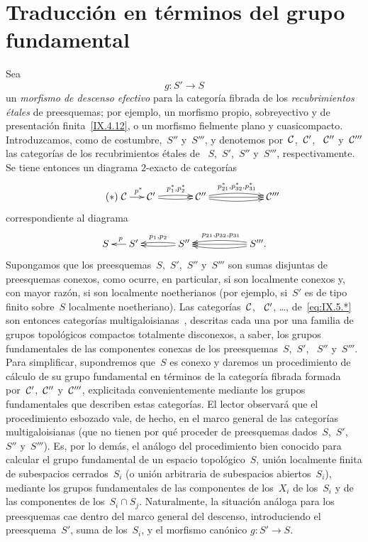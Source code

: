 \section{Traducción en términos del grupo fundamental}
\label{IX.5}

Sea
$$
g\colon S'\to S
$$
un \emph{morfismo de descenso efectivo} para la categoría fibrada de los
\emph{recubrimientos étales} de preesquemas; por ejemplo, un morfismo propio,
sobreyectivo y de presentación finita~\eqref{IX.4.12},
o un morfismo fielmente plano y cuasicompacto. Introduzcamos, como de
costumbre,~$S''$ y~$S'''$, y denotemos por~$\cal{C}$,~$\cal{C}'$,
~$\cal{C}''$ y~$\cal{C}'''$ las categorías de los recubrimientos étales de
~$S$,~$S'$,~$S''$ y~$S'''$, respectivamente. Se tiene entonces un diagrama
$2$-exacto de categorías
\begin{equation*}
\label{eq:IX.5.*}
\tag{$*$}
\xymatrix@C=.5cm{
{\cal{C}} \ar[r]^-{~p^*} & {\cal{C}'}
\ar@/^2pt/[rr]^{p_1^*,p_2^*} \ar@/_2pt/[rr] && {\cal{C}''}
\ar@/^4pt/[rrr]^{p_{21}^*,p_{32}^*,p_{31}^*} \ar[rrr] \ar@/_4pt/[rrr] &&&
{\cal{C}'''}
}
\end{equation*}
correspondiente al diagrama
$$
\xymatrix@C=.5cm{ S & \ar[l]_-{~p} S' && \ar@/^2pt/[ll] \ar@/_2pt/[ll]_-{p_1,p_2}
S'' &&& \ar@/^4pt/[lll] \ar[lll] \ar@/_4pt/[lll]_{p_{21},p_{32},p_{31}} S'''.
}
$$
Supongamos
que los preesquemas~$S$,~$S'$,~$S''$ y~$S'''$ son sumas disjuntas de
preesquemas conexos, como ocurre, en particular, si son localmente conexos y,
con mayor razón, si son localmente noetherianos (por ejemplo, si~$S'$ es de
tipo finito sobre~$S$ localmente noetheriano). Las categorías~$\cal{C}$,
~$\cal{C}'$, …, de~\eqref{eq:IX.5.*} son entonces categorías
multigaloisianas~, descritas cada una por una familia de grupos
topológicos compactos totalmente disconexos, a saber, los grupos
fundamentales de las componentes conexas de los preesquemas~$S$,~$S'$,
~$S''$ y~$S'''$. Para simplificar, supondremos que~$S$ es conexo y daremos un
procedimiento de cálculo de su grupo fundamental en términos de la categoría
fibrada formada por~$\cal{C}'$,~$\cal{C}''$ y~$\cal{C}'''$, explicitada
convenientemente mediante los grupos fundamentales que describen estas
categorías. El lector observará que el procedimiento esbozado vale, de hecho,
en el marco general de las categorías multigaloisianas (que no tienen por qué
proceder de preesquemas dados~$S$,~$S'$,~$S''$ y~$S'''$). Es, por lo demás,
el análogo del procedimiento bien conocido para calcular el grupo fundamental
de un espacio topológico~$S$, unión localmente finita de subespacios
cerrados~$S_i$ (o unión arbitraria de subespacios abiertos~$S_i$), mediante
los grupos fundamentales de las componentes
{de los~$X_i$}
{de los~$S_i$}
y de las componentes de los~$S_i\cap S_j$. Naturalmente, la situación análoga
para los preesquemas cae dentro del marco general del descenso, introduciendo
el preesquema~$S'$, suma de los~$S_i$, y el morfismo canónico
$g\colon S'\to S$.

